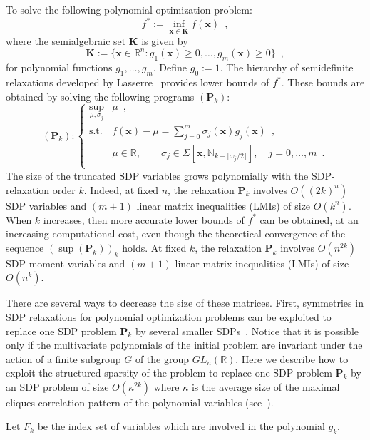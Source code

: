 \documentclass[a4paper,10pt]{article}
\newcommand{\R}{\mathbb{R}}
\newcommand{\N}{\mathbb{N}}
\newcommand{\x}{\mathbf{x}}
\def\P{\mathbf{P}}
\def\K{\mathbf{K}}
\theoremstyle{plain}
\theoremstyle{definition}
\theoremstyle{remark}
\begin{document}
To solve the following polynomial optimization problem:
\begin{equation}
\label{eq:densesos}
f^*  :=  \inf_{\x \in \K} f (\x)\enspace,
\end{equation}
where the semialgebraic set $\K$ is given by
\[\K := \{ \x \in \R^{n} : g_1 (\x) \geq 0, \dots, g_m (\x) \geq 0\}\enspace,\]
for polynomial functions $g_1, \dots, g_m$. Define $g_0 := 1$.
%
The hierarchy of semidefinite relaxations developed by Lasserre~\cite{Lasserre01moments} provides lower bounds of $f^*$. These bounds are obtained by solving the following programs $(\P_k)$:
\[
(\P_k):\left\{			
\begin{array}{ll}
\sup_{\mu, \sigma_j} & \mu\enspace, \\			 
\text{s.t.} & f (\x) - \mu = \sum\limits_{j = 0}^{m} \sigma_j(\x) g_j(\x)\enspace, \\
& \mu\in \R,\qquad \sigma_j \in \Sigma[\x, \N_{k - \lceil \omega_j / 2 \rceil }], \quad j = 0,\dots,m \enspace.\\
\end{array} \right.
\]
%
The size of the truncated SDP variables
grows polynomially with the SDP-relaxation order $k$.
Indeed, at fixed $n$, the relaxation $\P_k$ involves $O((2k)^{n})$ SDP
variables and $(m + 1)$ linear matrix inequalities (LMIs) of size
$O(k^{n})$. When  $k$ increases, then more accurate lower bounds of $f^*$ can be obtained, 
at an increasing computational cost, even though the theoretical convergence 
of the sequence $(\sup (\P_k))_{k}$ holds. At fixed $k$,  the relaxation $\P_k$ involves $O(n^{2k})$ SDP
moment variables and $(m + 1)$ linear matrix inequalities (LMIs) of size
$O(n^{k})$.

There are several ways to decrease the size of these matrices. 
First, symmetries in SDP relaxations for polynomial optimization problems can be exploited to replace one SDP problem $\P_k$ by
several smaller SDPs~\cite{Riener2013SymmetricSDP}. Notice that it is possible only if the multivariate polynomials of the initial problem are invariant under the action of a finite subgroup $G$ of the group $GL_{n}(\R)$. 
%
Here we describe how to exploit the structured sparsity of the
problem to replace one SDP problem $\P_k$ by an SDP problem of
size $O (\kappa^ {2 k})$ where $\kappa$ is the average size
of the maximal cliques correlation pattern of the polynomial
variables (see~\cite{Waki06SparseSOS}). 


Let $F_k$ be the index set of variables which are involved in the polynomial $g_k$. 
 
\end{document}
